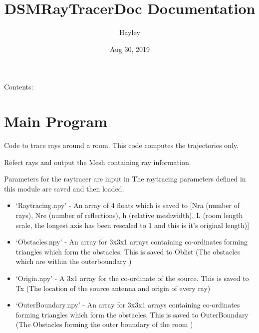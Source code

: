 \documentclass[letterpaper,10pt,english]{sphinxmanual}
\title{DSMRayTracerDoc Documentation}
\date{Aug 30, 2019}
\author{Hayley}
\begin{document}
\maketitle
\tableofcontents
{}\label{index::doc}


Contents:


\chapter{Main Program}
\label{index:main-program}\label{index:module-RayTracerMainProgram}\label{index:welcome-to-dsmraytracerdoc-s-documentation}
Code to trace rays around a room. This code computes the trajectories only.

\begin{fulllineitems}
\label{index:RayTracerMainProgram.MeshProgram}
Refect rays and output the Mesh containing ray information.

Parameters for the raytracer are input in {\hyperref[index:module\string-ParameterInput]{}}
The raytracing parameters defined in this module are saved and then loaded.
\begin{itemize}
\item {} 
`Raytracing.npy' - An array of 4 floats which is saved to   {[}Nra (number of rays), Nre (number of reflections),   h (relative meshwidth),   L (room length scale, the longest axis has been rescaled to 1 and this   is it's original length){]}

\item {} 
`Obstacles.npy'  - An array for 3x3x1 arrays containing co-ordinates   forming triangles which form the obstacles. This is saved to Oblist   (The obstacles which are within the outerboundary )

\item {} 
`Origin.npy'     - A 3x1 array for the co-ordinate of the source.   This is saved to Tx  (The location of the source antenna and origin   of every ray)

\item {} 
`OuterBoundary.npy' - An array for 3x3x1 arrays containing   co-ordinates forming triangles which form the obstacles. This is   saved to OuterBoundary   (The Obstacles forming the outer boundary of   the room )

\end{itemize}


\end{fulllineitems}
\end{document}

